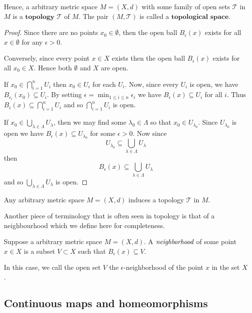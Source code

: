 Hence, a arbitrary metric space $M=(X,d)$ with some family of open sets
$\mathcal{T}$ in $M$ is a $\textbf{topology}$ $\mathcal{T}$ of $M$. The
pair $(M,\mathcal{T})$ is called a $\textbf{topological space}$.

\begin{proof}
	Since there are no points $x_0 \in \emptyset$, then the open ball
	$B_{\epsilon}(x)$ exists for all $x \in \emptyset$ for any $\epsilon > 0$.

	Conversely, since every point $x \in X$ exists then the open ball
	$B_{\epsilon}(x)$ exists for all $x_0 \in X$. Hence both $\emptyset$ and $X$ are open.
	
	If $\displaystyle x_0 \in \bigcap_{i=1}^{n} U_i$ then $x_0 \in U_i$ for each $U_i$.
	Now, since every $U_i$ is open, we have $B_{\epsilon_i}(x_0) \subseteq U_i$. By setting
	$\displaystyle \epsilon = \min_{1 \leq i \leq n} \epsilon_i$ we have $B_{\epsilon}(x) \subseteq U_i$
	for all $i$. Thus $B_{\epsilon}(x) \subseteq \displaystyle \bigcap_{i=1}^{n} U_i$ and so
	$\displaystyle \bigcap_{i=1}^{n} U_i$ is open.

	If $x_0 \in \displaystyle \bigcup_{\lambda \in \Lambda} U_{\lambda}$, then we may find
	some $\lambda_0 \in \Lambda$ so that $x_0 \in U_{\lambda_0}$. Since $U_{\lambda_0}$ is
	open we have $B_{\epsilon}(x) \subseteq U_{\lambda_0}$ for some $\epsilon > 0$. Now since
	\[
		U_{\lambda_0} \subseteq \bigcup_{\lambda \in \Lambda} U_{\lambda}
	\]
	then
	\[
		B_{\epsilon}(x) \subseteq \bigcup_{\lambda \in \Lambda} U_{\lambda}
	\]
	and so $\displaystyle \bigcup_{\lambda \in \Lambda} U_{\lambda}$ is open.
\end{proof}

\begin{lem}
	Any arbitrary metric space $M=(X,d)$ induces a topology $\mathcal{T}$ in $M$.
\end{lem}

Another piece of terminology that is often seen in topology is
that of a neighbourhood which we define here for completeness.

\begin{defn}[Neighbourhood]
	Suppose a arbitrary metric space $M=(X,d)$. A $\emph{neighborhood}$
	of some point $x \in X$ is a subset $V \subset X$ such that
	$B_{\epsilon}(x) \subseteq V$.

	In this case, we call the open set $V$ the $\epsilon$-neighborhood
	of the point $x$ in the set $X$.
\end{defn}

\subsection{Continuous maps and homeomorphisms}


